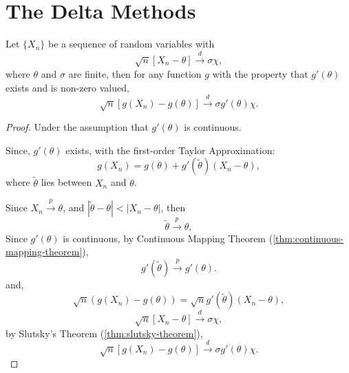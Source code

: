 
\chapter{The Delta Methods}

\begin{theorem}
    Let $\{X_{n}\}$ be a sequence of random variables with
    \begin{equation*}
        \sqrt{n}\left[X_{n}-\theta\right] \stackrel{d}{\rightarrow}\sigma\chi,
    \end{equation*}
    where $\theta$ and $\sigma$ are finite, then for any function $g$ with the property that $g'(\theta)$ exists and is non-zero valued,
    \begin{equation*}
        \sqrt{n}\left[g\left(X_{n}\right)-g(\theta)\right] \stackrel{d}{\rightarrow} \sigma g'(\theta)\chi.
    \end{equation*}
\end{theorem}

\begin{proof}
    Under the assumption that $g'(\theta)$ is continuous.

    Since, $g'(\theta)$ exists, with the first-order Taylor Approximation:
    \begin{equation*}
        g(X_n)=g(\theta)+g'(\tilde{\theta})(X_n-\theta),
    \end{equation*}
    where $\tilde{\theta}$ lies between $X_n$ and $\theta$.

    Since $X_n\stackrel{p}{\rightarrow}\theta$, and $|\tilde{\theta}-\theta|<|X_n-\theta|$, then
    \begin{equation*}
        \tilde{\theta}\stackrel{p}{\rightarrow}\theta,
    \end{equation*}
    Since $g'(\theta)$ is continuous, by Continuous Mapping Theorem (\ref{thm:continuous-mapping-theorem}),
    \begin{equation*}
        g'(\tilde{\theta})\stackrel{p}{\rightarrow}g'(\theta).
    \end{equation*}
    and,
    \begin{equation*}
        \sqrt{n}\left(g(X_n)-g(\theta)\right)=\sqrt{n}g'(\tilde{\theta})(X_n-\theta),
    \end{equation*}
    \begin{equation*}
        \sqrt{n}\left[X_{n}-\theta\right] \stackrel{d}{\rightarrow}\sigma\chi,
    \end{equation*}
    by Slutsky's Theorem (\ref{thm:slutsky-theorem}),
    \begin{equation*}
        \sqrt{n}\left[g\left(X_{n}\right)-g(\theta)\right] \stackrel{d}{\rightarrow} \sigma g'(\theta)\chi.
    \end{equation*}
\end{proof}
